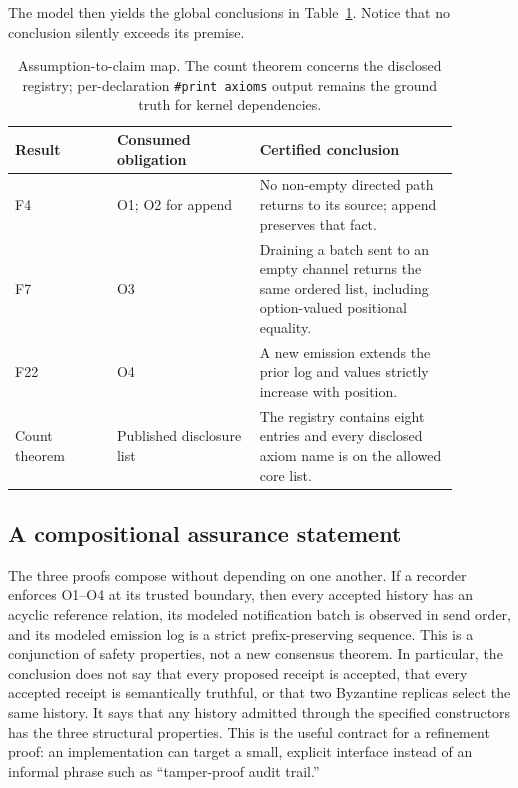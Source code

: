 \documentclass[11pt,letterpaper]{article}
\theoremstyle{definition}
\begin{document}
The model then yields the global conclusions in
Table~\ref{tab:assumption-claim}. Notice that no conclusion silently exceeds
its premise.

\begin{table}[t]
\centering
\small
\begin{tabular}{@{}p{0.20\linewidth}p{0.29\linewidth}p{0.39\linewidth}@{}}
\toprule
Result & Consumed obligation & Certified conclusion \\
\midrule
F4 & O1; O2 for append & No non-empty directed path returns to its source;
append preserves that fact. \\
F7 & O3 & Draining a batch sent to an empty channel returns the same ordered
list, including option-valued positional equality. \\
F22 & O4 & A new emission extends the prior log and values strictly increase
with position. \\
Count theorem & Published disclosure list & The registry contains eight
entries and every disclosed axiom name is on the allowed core list. \\
\bottomrule
\end{tabular}
\caption{Assumption-to-claim map. The count theorem concerns the disclosed
registry; per-declaration \texttt{\#print axioms} output remains the ground
truth for kernel dependencies.}
\label{tab:assumption-claim}
\end{table}

\subsection{A compositional assurance statement}

The three proofs compose without depending on one another. If a recorder
enforces O1--O4 at its trusted boundary, then every accepted history has an
acyclic reference relation, its modeled notification batch is observed in send
order, and its modeled emission log is a strict prefix-preserving sequence.
This is a conjunction of safety properties, not a new consensus theorem. In
particular, the conclusion does not say that every proposed receipt is accepted,
that every accepted receipt is semantically truthful, or that two Byzantine
replicas select the same history. It says that any history admitted through the
specified constructors has the three structural properties. This is the useful
contract for a refinement proof: an implementation can target a small, explicit
interface instead of an informal phrase such as ``tamper-proof audit trail.''
\end{document}
